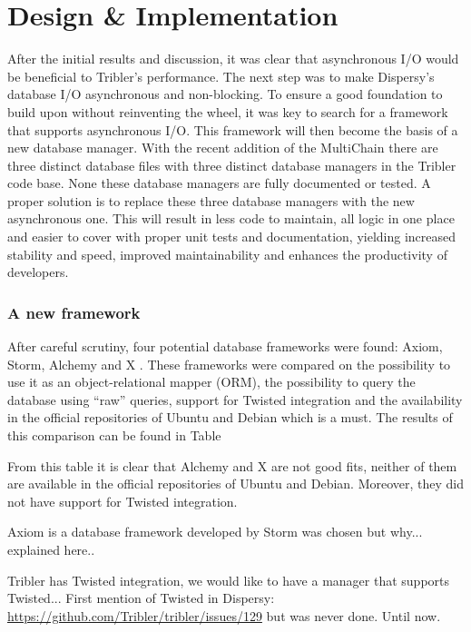 \chapter{Design \& Implementation}

After the initial results and discussion, it was clear that asynchronous I/O would be beneficial to Tribler's performance.
The next step was to make Dispersy's database I/O asynchronous and non-blocking.
To ensure a good foundation to build upon without reinventing the wheel, it was key to search for a framework that supports asynchronous I/O.
This framework will then become the basis of a new database manager.
With the recent addition of the MultiChain there are three distinct database files with three distinct database managers in the Tribler code base.
None these database managers are fully documented or tested.
A proper solution is to replace these three database managers with the new asynchronous one.
This will result in less code to maintain, all logic in one place and easier to cover with proper unit tests and documentation, yielding increased stability and speed, improved maintainability and enhances the productivity of developers.

\subsection{A new framework}

After careful scrutiny, four potential database frameworks were found: Axiom, Storm, Alchemy and X .
These frameworks were compared on the possibility to use it as an object-relational mapper (ORM), the possibility to query the database using \enquote{raw} queries, support for Twisted integration and the availability in the official repositories of Ubuntu and Debian which is a must.
The results of this comparison can be found in Table~ 


From this table it is clear that Alchemy and X  are not good fits, neither of them are available in the official repositories of Ubuntu and Debian. Moreover, they did not have support for Twisted integration.

Axiom is a database framework developed by 
Storm was chosen but why... explained here..

Tribler has Twisted integration, we would like to have a manager that supports Twisted...
First mention of Twisted in Dispersy: \url{https://github.com/Tribler/tribler/issues/129} but was never done.
Until now.


